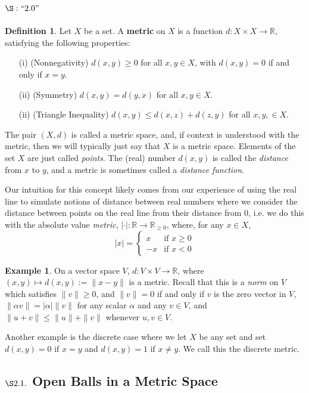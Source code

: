 \documentclass[9pt,reqno]{amsart}
\theoremstyle{definition}
\newtheorem{defi}{Definition}[section]
\newtheorem{ex}{Example}[section]
\newcommand{\rr}{\mathbb R}
\begin{document}
\subsection*{$\S: ``2.0"$} 
\begin{defi} Let $X$ be a set. A \textbf{metric} on $X$ is a function $d \colon X \times X \to \rr$, satisfying the following properties:
\begin{itemize}
	\item [(i)] (Nonnegativity) $d(x,y) \geq 0 $ for all $x,y \in X$, with $d(x,y) = 0$ if and only if $x=y$. 
	\item [(ii)] (Symmetry) $d(x,y) = d(y,x)$ for all $x,y \in X$. 
	\item [(ii)] (Triangle Inequality) $d(x,y) \leq d(x,z) + d(z,y)$ for all $x, y, \in X$. 
\end{itemize}
The pair $(X,d)$ is called a metric space, and, if context is understood with the metric, then we will typically just say that $X$ is a metric space. Elements of the set $X$ are just called \textit{points}. The (real) number $d(x,y)$ is called the \textit{distance} from $x$ to $y$, and a metric is sometimes called a \textit{distance function}. 
\end{defi}
Our intuition for this concept likely comes from our experience of using the real line to simulate notions of distance between real numbers where we consider the distance between points on the real line from their distance from $0$, i.e. we do this with the absolute value \textit{metric}, $| \cdot | \colon \rr \to \rr_{\geq 0}$, where, for any $x \in X$, 
\[
|x| = \begin{cases}
	x & \text{if $x \geq 0$} \\
	-x & \text{if $x < 0$}
\end{cases}
\]
\begin{ex} On a vector space $V$, $d \colon V \times V \to \rr$, where $(x,y) \mapsto d(x,y) := \|x-y\|$ is a metric. Recall that this is a \textit{norm} on $V$ which satisfies $\|v \| \geq 0$, and $\|v \| =0$ if and only if $v$ is the zero vector in $V$, $\|\alpha v \| = |\alpha | \|v \|$ for any scalar $\alpha$ and any $v \in V$, and $\|u+v \| \leq \|u \| + \| v \|$ whenever $u,v \in V$.

Another example is the discrete case where we let $X$ be any set and set $d(x,y) = 0$ if $x = y$ and $d(x,y) = 1$ if $x \neq y$. We call this the discrete metric. 
\end{ex}


\subsection{$\S2.1.$ Open Balls in a Metric Space}
\end{document}
